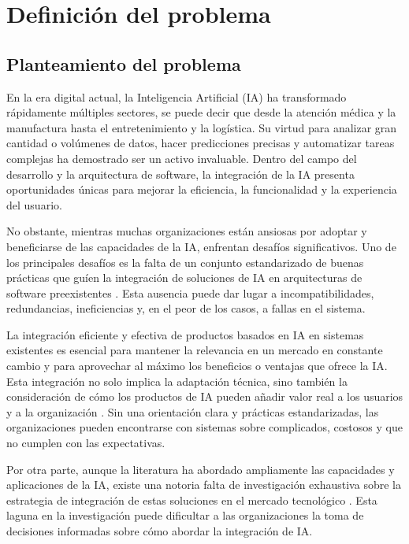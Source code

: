 \section{Definición del problema}

\subsection{Planteamiento del problema}
En la era digital actual, la Inteligencia Artificial (IA) ha transformado rápidamente múltiples sectores, se puede decir que desde la atención médica y la manufactura hasta el entretenimiento y la logística. Su virtud para analizar gran cantidad o volúmenes de datos, hacer predicciones precisas y automatizar tareas complejas ha demostrado ser un activo invaluable. Dentro del campo del desarrollo y la arquitectura de software, la integración de la IA presenta oportunidades únicas para mejorar la eficiencia, la funcionalidad y la experiencia del usuario.

No obstante, mientras muchas organizaciones están ansiosas por adoptar y beneficiarse de las capacidades de la IA, enfrentan desafíos significativos. Uno de los principales desafíos es la falta de un conjunto estandarizado de buenas prácticas que guíen la integración de soluciones de IA en arquitecturas de software preexistentes \citep{Wang2016ImplementingOutlook}. Esta ausencia puede dar lugar a incompatibilidades, redundancias, ineficiencias y, en el peor de los casos, a fallas en el sistema.

La integración eficiente y efectiva de productos basados en IA en sistemas existentes es esencial para mantener la relevancia en un mercado en constante cambio y para aprovechar al máximo los beneficios o ventajas que ofrece la IA. Esta integración no solo implica la adaptación técnica, sino también la consideración de cómo los productos de IA pueden añadir valor real a los usuarios y a la organización \citep{Cui2022ConstructionIntelligence}. Sin una orientación clara y prácticas estandarizadas, las organizaciones pueden encontrarse con sistemas sobre complicados, costosos y que no cumplen con las expectativas.

Por otra parte, aunque la literatura ha abordado ampliamente las capacidades y aplicaciones de la IA, existe una notoria falta de investigación exhaustiva sobre la estrategia de integración de estas soluciones en el mercado tecnológico \citep{Cui2022ConstructionIntelligence}. Esta laguna en la investigación puede dificultar a las organizaciones la toma de decisiones informadas sobre cómo abordar la integración de IA.

